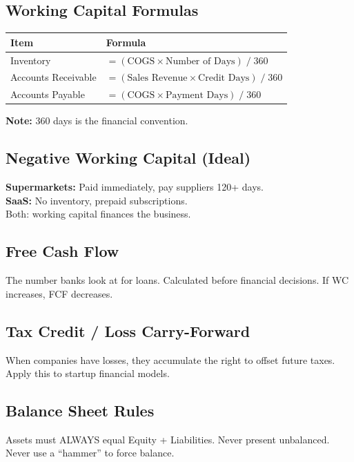 \documentclass[a4paper,11pt]{article}
\begin{document}
\subsection{Working Capital Formulas}

\begin{tabular}{@{}ll@{}}
\toprule
\textbf{Item} & \textbf{Formula} \\
\midrule
Inventory & $= (\text{COGS} \times \text{Number of Days}) \;/\; 360$ \\
Accounts Receivable & $= (\text{Sales Revenue} \times \text{Credit Days}) \;/\; 360$ \\
Accounts Payable & $= (\text{COGS} \times \text{Payment Days}) \;/\; 360$ \\
\bottomrule
\end{tabular}

\vspace{4pt}
\textbf{Note:} 360 days is the financial convention.

\subsection{Negative Working Capital (Ideal)}

\textbf{Supermarkets:} Paid immediately, pay suppliers 120+ days.\\
\textbf{SaaS:} No inventory, prepaid subscriptions.\\
Both: working capital finances the business.

\subsection{Free Cash Flow}

The number banks look at for loans. Calculated before financial decisions. If WC increases, FCF decreases.

\subsection{Tax Credit / Loss Carry-Forward}

When companies have losses, they accumulate the right to offset future taxes. Apply this to startup financial models.

\subsection{Balance Sheet Rules}

Assets must ALWAYS equal Equity + Liabilities. Never present unbalanced. Never use a ``hammer'' to force balance.
\end{document}
